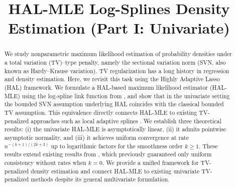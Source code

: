 \documentclass[aos]{imsart}
\numberwithin{equation}{section}
\theoremstyle{plain}
\theoremstyle{definition}
\theoremstyle{definition}
\begin{document}
\begin{frontmatter}

\title{HAL-MLE Log-Splines Density Estimation (Part I: Univariate)}


\begin{abstract}
We study nonparametric maximum likelihood estimation of probability densities under a total variation (TV)–type penalty, namely the sectional variation norm (SVN, also known as Hardy–Krause variation). TV regularization has a long history in regression and density estimation. Here, we revisit this task using the Highly Adaptive Lasso (HAL) framework. We formulate a HAL-based maximum likelihood estimator (HAL-MLE) using the log-spline link function from \citet{kooperberg1992logspline}, and show that in the univariate setting the bounded SVN assumption underlying HAL coincides with the classical bounded TV assumption. This equivalence directly connects HAL-MLE to existing TV-penalized approaches such as local adaptive splines \citep{mammen1997locally}. 
We establish three theoretical results: (i) the univariate HAL-MLE is asymptotically linear, (ii) it admits pointwise asymptotic normality, and (iii) it achieves uniform convergence at rate $n^{-(k+1)/(2k+3)}$ up to logarithmic factors for the smoothness order $k \geq 1$. These results extend existing results from \citet{van2017uniform}, which previously guaranteed only uniform consistency without rates when $k=0$. We provide a unified framework for TV-penalized density estimation and connect HAL-MLE to existing univariate TV-penalized methods despite its general multivariate formulation. 
\end{abstract}

\begin{keyword}[class=MSC]
\end{keyword}

\begin{keyword}
\end{keyword}

\end{frontmatter}
\end{document}
